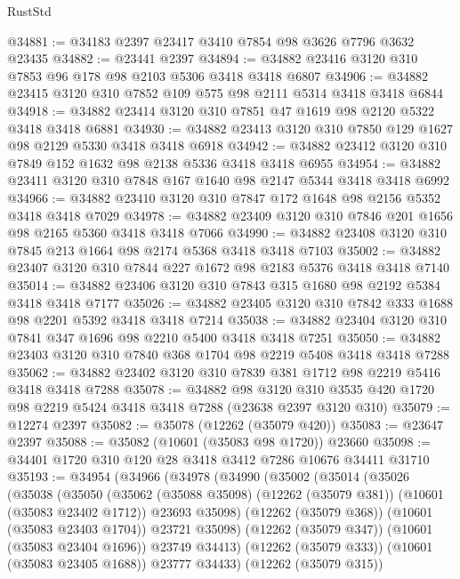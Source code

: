 \begin{lexlean}{RustStd}
\begin{coremodule}
@34881 := @34183 @2397 @23417 @3410 @7854 @98 @3626 @7796 @3632 @23435
@34882 := @23441 @2397
@34894 := @34882 @23416 @3120 @310 @7853 @96 @178 @98 @2103 @5306 @3418 @3418 @6807
@34906 := @34882 @23415 @3120 @310 @7852 @109 @575 @98 @2111 @5314 @3418 @3418 @6844
@34918 := @34882 @23414 @3120 @310 @7851 @47 @1619 @98 @2120 @5322 @3418 @3418 @6881
@34930 := @34882 @23413 @3120 @310 @7850 @129 @1627 @98 @2129 @5330 @3418 @3418 @6918
@34942 := @34882 @23412 @3120 @310 @7849 @152 @1632 @98 @2138 @5336 @3418 @3418 @6955
@34954 := @34882 @23411 @3120 @310 @7848 @167 @1640 @98 @2147 @5344 @3418 @3418 @6992
@34966 := @34882 @23410 @3120 @310 @7847 @172 @1648 @98 @2156 @5352 @3418 @3418 @7029
@34978 := @34882 @23409 @3120 @310 @7846 @201 @1656 @98 @2165 @5360 @3418 @3418 @7066
@34990 := @34882 @23408 @3120 @310 @7845 @213 @1664 @98 @2174 @5368 @3418 @3418 @7103
@35002 := @34882 @23407 @3120 @310 @7844 @227 @1672 @98 @2183 @5376 @3418 @3418 @7140
@35014 := @34882 @23406 @3120 @310 @7843 @315 @1680 @98 @2192 @5384 @3418 @3418 @7177
@35026 := @34882 @23405 @3120 @310 @7842 @333 @1688 @98 @2201 @5392 @3418 @3418 @7214
@35038 := @34882 @23404 @3120 @310 @7841 @347 @1696 @98 @2210 @5400 @3418 @3418 @7251
@35050 := @34882 @23403 @3120 @310 @7840 @368 @1704 @98 @2219 @5408 @3418 @3418 @7288
@35062 := @34882 @23402 @3120 @310 @7839 @381 @1712 @98 @2219 @5416 @3418 @3418 @7288
@35078 := @34882
    @98
    @3120
    @310
    @3535
    @420
    @1720
    @98
    @2219
    @5424
    @3418
    @3418
    @7288
    (@23638 @2397 @3120 @310)
@35079 := @12274 @2397
@35082 := @35078 (@12262 (@35079 @420))
@35083 := @23647 @2397
@35088 := @35082 (@10601 (@35083 @98 @1720)) @23660
@35098 := @34401 @1720 @310 @120 @28 @3418 @3412 @7286 @10676 @34411 @31710
@35193 := @34954
    (@34966
      (@34978
        (@34990
          (@35002
            (@35014
              (@35026
                (@35038
                  (@35050
                    (@35062
                      (@35088 @35098)
                      (@12262 (@35079 @381))
                      (@10601 (@35083 @23402 @1712))
                      @23693
                      @35098)
                    (@12262 (@35079 @368))
                    (@10601 (@35083 @23403 @1704))
                    @23721
                    @35098)
                  (@12262 (@35079 @347))
                  (@10601 (@35083 @23404 @1696))
                  @23749
                  @34413)
                (@12262 (@35079 @333))
                (@10601 (@35083 @23405 @1688))
                @23777
                @34433)
              (@12262 (@35079 @315))

\end{coremodule}
\end{lexlean}
